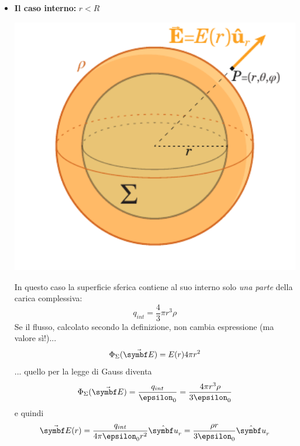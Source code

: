 \begin{itemize}
	\item \textbf{Il caso interno:} $r<R$\\
	\begin{minipage}{0.4\textwidth}
		\begin{center}
			\includegraphics[width=1\textwidth]{images/chp2/chp2sferacarica2.pdf}
		\end{center}
	\end{minipage}
	\begin{minipage}{0.5\textwidth}
		In questo caso la superficie sferica contiene al suo interno solo \textit{una parte} della carica complessiva:
		\begin{equation*}
			q_{int}=\frac{4}{3}\pi r^3\rho
		\end{equation*}
		Se il flusso, calcolato secondo la definizione, non cambia espressione (ma valore sì!)...
		\begin{equation*}
			\Phi_{\Sigma}(\vba{E})=E(r)4\pi r^2
		\end{equation*}
		... quello per la legge di Gauss diventa
		\begin{equation*}
			\Phi_{\Sigma}(\vba{E})=\frac{q_{int}}{\epsilon_0}=\frac{4 \pi r^3\rho}{3\epsilon_0}
		\end{equation*}
		e quindi
		\begin{equation}
			\vba{E}(r)=\frac{q_{int}}{4\pi\epsilon_0 r^2}\vbh{u}_r=\frac{\rho r}{3\epsilon_0}\vbh{u}_r
		\end{equation}
	\end{minipage}
\end{itemize}
